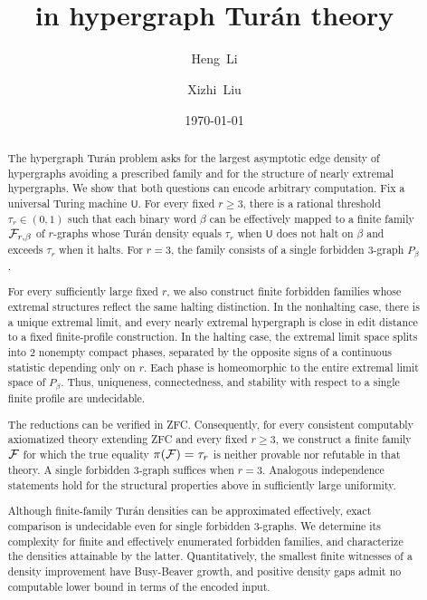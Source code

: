 \documentclass[10pt]{article}
\title{\fontsize{16}{20}\selectfont\bfseries \makebox[\textwidth][c]{Turing universality, computability, and incompleteness}\\ in hypergraph Tur\'an theory}
\author{Heng~Li\and Xizhi~Liu}
\date{\today}
\numberwithin{equation}{section}
\theoremstyle{definition}
\begin{document}
\maketitle
\begin{abstract}
The hypergraph Tur\'an problem asks for the largest asymptotic edge density of hypergraphs avoiding a prescribed family and for the structure of nearly extremal hypergraphs. We show that both questions can encode arbitrary computation. Fix a universal Turing machine $\mathsf U$. For every fixed $r\ge3$, there is a rational threshold $\tau_r\in(0,1)$ such that each binary word $\beta$ can be effectively mapped to a finite family $\mathcal F_{r,\beta}$ of $r$-graphs whose Tur\'an density equals $\tau_r$ when $\mathsf U$ does not halt on $\beta$ and exceeds $\tau_r$ when it halts. For $r=3$, the family consists of a single forbidden $3$-graph $P_\beta$.

For every sufficiently large fixed $r$, we also construct finite forbidden families whose extremal structures reflect the same halting distinction. In the nonhalting case, there is a unique extremal limit, and every nearly extremal hypergraph is close in edit distance to a fixed finite-profile construction. In the halting case, the extremal limit space splits into 2 nonempty compact phases, separated by the opposite signs of a continuous statistic depending only on $r$. Each phase is homeomorphic to the entire extremal limit space of $P_\beta$. Thus, uniqueness, connectedness, and stability with respect to a single finite profile are undecidable.

The reductions can be verified in ZFC. Consequently, for every consistent computably axiomatized theory extending ZFC and every fixed $r\ge3$, we construct a finite family $\mathcal F$ for which the true equality $\pi(\mathcal F)=\tau_r$ is neither provable nor refutable in that theory. A single forbidden $3$-graph suffices when $r=3$. Analogous independence statements hold for the structural properties above in sufficiently large uniformity.

Although finite-family Tur\'an densities can be approximated effectively, exact comparison is undecidable even for single forbidden $3$-graphs. We determine its complexity for finite and effectively enumerated forbidden families, and characterize the densities attainable by the latter. Quantitatively, the smallest finite witnesses of a density improvement have Busy-Beaver growth, and positive density gaps admit no computable lower bound in terms of the encoded input.
\end{abstract}
\end{document}
